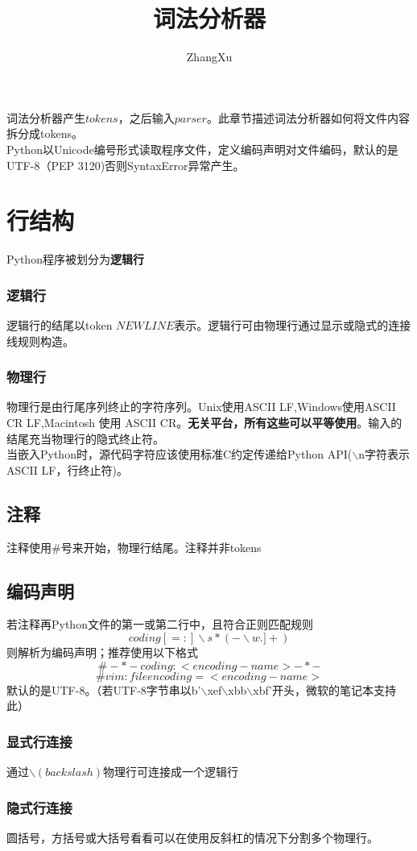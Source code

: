 \documentclass[10pt,UTF8]{ctexart}
\title{词法分析器}
\author{ZhangXu}
\begin{document}
\maketitle
词法分析器产生$tokens$，之后输入$parser$。此章节描述词法分析器如何将文件内容拆分成tokens。\\
\indent Python以Unicode编号形式读取程序文件，定义编码声明对文件编码，默认的是UTF-8（PEP 3120)否则SyntaxError异常产生。
\section{行结构}
Python程序被划分为\textbf{逻辑行}
\subsubsection{逻辑行}
逻辑行的结尾以token $NEWLINE$表示。逻辑行可由物理行通过显示或隐式的连接线规则构造。
\subsubsection{物理行}
物理行是由行尾序列终止的字符序列。Unix使用ASCII LF,Windows使用ASCII CR LF,Macintosh 使用 ASCII CR。\textbf{无关平台，所有这些可以平等使用}。输入的结尾充当物理行的隐式终止符。\\
\indent 当嵌入Python时，源代码字符应该使用标准C约定传递给Python API($\backslash $n字符表示ASCII LF，行终止符)。
\subsection{注释}
注释使用$\#$号来开始，物理行结尾。注释并非tokens
\subsection{编码声明}
若注释再Python文件的第一或第二行中，且符合正则匹配规则\[coding[=:]\backslash s*(-\backslash w.]+)\]则解析为编码声明；推荐使用以下格式\[\# -*- coding:<encoding-name> -*-\] \[\# vim:fileencoding=<encoding-name>\]
默认的是UTF-8。（若UTF-8字节串以b'$\backslash$xef$\backslash$xbb$\backslash$xbf'开头，微软的笔记本支持此）
\subsubsection{显式行连接}
通过$\backslash(backslash)$物理行可连接成一个逻辑行
\subsubsection{隐式行连接}
圆括号，方括号或大括号看看可以在使用反斜杠的情况下分割多个物理行。
\end{document}
